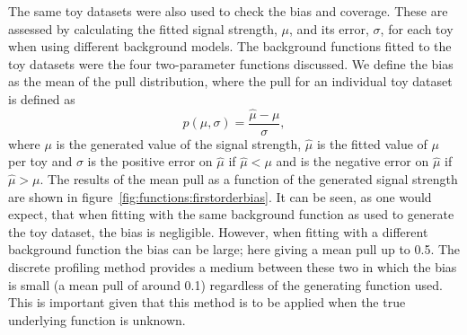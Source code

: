 The same toy datasets were also used to check the bias and coverage.
These are assessed by calculating the fitted signal strength, $\mu$, and its error, $\sigma$, for each toy when using different background models. The background functions fitted to the toy datasets were the four two-parameter functions discussed.
We define the bias as the mean of the pull distribution, where the pull for an individual toy dataset is defined as
\begin{displaymath}
	p(\mu,\sigma) = \frac{\hat{\mu}-\mu}{\sigma},
\end{displaymath}
where $\mu$ is the generated value of the signal strength, $\hat{\mu}$ is the fitted value of $\mu$ per toy and $\sigma$ is the positive error on $\hat{\mu}$ if $\hat{\mu} < \mu$ and is the negative error on $\hat{\mu}$ if $\hat{\mu} > \mu$. The results of the mean pull as a function of the generated signal strength are shown in figure~\ref{fig:functions:firstorderbias}. It can be seen, as one would expect, that when fitting with the same background function as used to generate the toy dataset, the bias is negligible.
However, when fitting with a different background function the bias can be large; here giving a mean pull up to 0.5.
The discrete profiling method provides a medium between these two in which the bias is small (a mean pull of around 0.1) regardless of the generating function used. This is important given that this method is to be applied when the true underlying function is unknown.
%
